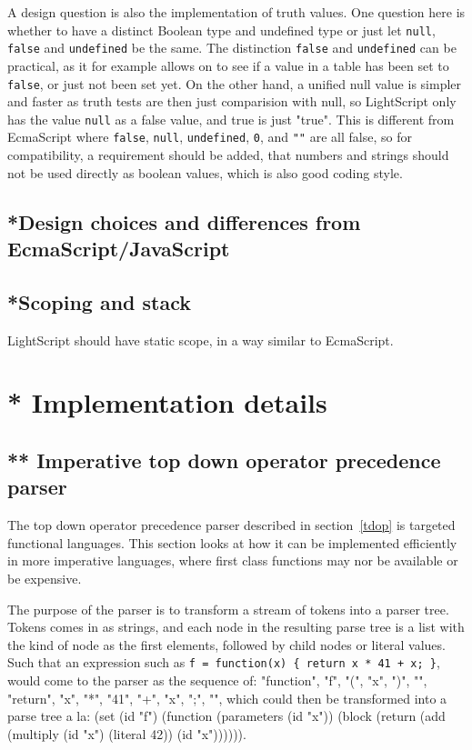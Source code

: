 A design question is also the implementation of truth values. 
One question here is whether to have a distinct Boolean type and undefined type or just let 
\verb|null|, \verb|false| and \verb|undefined| be the same.
The distinction \verb|false| and \verb|undefined| can be practical\cite{luahopl}, as it for example allows on to see if a value in a table has been set to \verb|false|, or just not been set yet.
On the other hand, a unified null value is simpler and faster as truth tests are then just comparision with null, so LightScript only has the value \verb|null| as a false value, and true is just "true". 
This is different from EcmaScript where \verb|false|, \verb|null|, \verb|undefined|, \verb|0|, and \verb|""| are all false, so for compatibility, a requirement should be added, that numbers and strings should not be used directly as boolean values, which is also good coding style. 



\subsection{*Design choices and differences from EcmaScript/JavaScript}



\subsection{*Scoping and stack}

LightScript should have static scope, in a way similar to EcmaScript. 

\section{* Implementation details}
\subsection{** Imperative top down operator precedence parser}
The top down operator precedence parser described in section~\ref{tdop} is targeted functional languages.
This section looks at how it can be implemented efficiently in more imperative languages, where first class functions may nor be available or be expensive.

The purpose of the parser is to transform a stream of tokens into a parser tree.
Tokens comes in as strings, and each node in the resulting parse tree is a list with the kind of node as the first elements, followed by child nodes or literal values.
Such that an expression such as \verb~f = function(x) { return x * 41 + x; }~, would come to the parser as the sequence of: 
"function", "f", "(", "x", ")", "{", "return", "x", "*", "41", "+", "x", ";", "}",
which could
then be transformed into a parse tree a la: (set (id "f") (function (parameters (id "x")) (block (return (add (multiply (id "x") (literal 42)) (id "x")))))).


